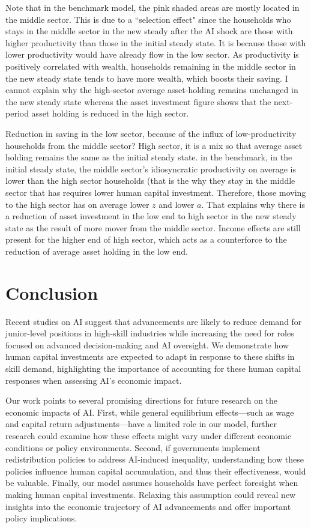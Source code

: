 \documentclass[12pt]{article}
\begin{document}
Note that in the benchmark model, the pink shaded areas are mostly located in the middle sector. This is due to a ``selection effect" since the households who stays in the middle sector in the new steady after the AI shock are those with higher productivity than those in the initial steady state. It is because those with lower productivity would have already flow in the low sector. As productivity is positively correlated with wealth, households remaining in the middle sector in the new steady state tends to have more wealth, which boosts their saving. {\color{red} I cannot explain why the high-sector average asset-holding remains unchanged in the new steady state whereas the asset investment figure shows that the next-period asset holding is reduced in the high sector.} 

Reduction in saving in the low sector, because of the influx of low-productivity households from the middle sector?
High sector, it is a mix so that average asset holding remains the same as the initial steady state. 
in the benchmark, in the initial steady state, the middle sector's idiosyncratic productivity on average is lower than the high sector households (that is the why they stay in the middle sector that has requires lower human capital investment. Therefore, those moving to the high sector has on average lower $z$ and lower $a$. That explains why there is a reduction of asset investment in the low end to high sector in the new steady state as the result of more mover from the middle sector. 
Income effects are still present for the higher end of high sector, which acts as a counterforce to the reduction of average asset holding in the low end.




\section{Conclusion}

Recent studies on AI suggest that advancements are likely to reduce demand for junior-level positions in high-skill industries while increasing the need for roles focused on advanced decision-making and AI oversight. We demonstrate how human capital investments are expected to adapt in response to these shifts in skill demand, highlighting the importance of accounting for these human capital responses when assessing AI’s economic impact.

Our work points to several promising directions for future research on the economic impacts of AI. First, while general equilibrium effects—such as wage and capital return adjustments—have a limited role in our model, further research could examine how these effects might vary under different economic conditions or policy environments. Second, if governments implement redistribution policies to address AI-induced inequality, understanding how these policies influence human capital accumulation, and thus their effectiveness, would be valuable. Finally, our model assumes households have perfect foresight when making human capital investments. Relaxing this assumption could reveal new insights into the economic trajectory of AI advancements and offer important policy implications.
\end{document}
